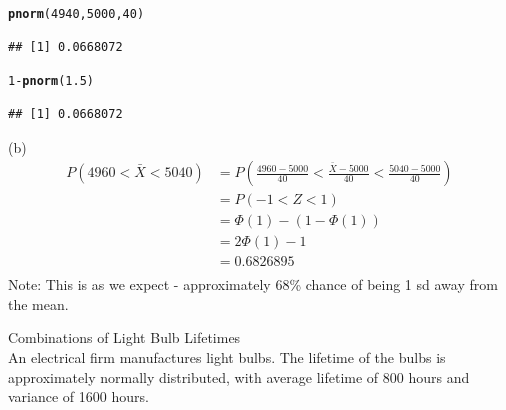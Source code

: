 \documentclass[bigtut]{tutorial}\usepackage[]{graphicx}\usepackage[]{color}
\makeatletter
\newcommand{\hlnum}[1]{\textcolor[rgb]{0.686,0.059,0.569}{#1}}%
\newcommand{\hlopt}[1]{\textcolor[rgb]{0,0,0}{#1}}%
\newcommand{\hlstd}[1]{\textcolor[rgb]{0.345,0.345,0.345}{#1}}%
\newcommand{\hlkwd}[1]{\textcolor[rgb]{0.737,0.353,0.396}{\textbf{#1}}}%
\newenvironment{kframe}{%
 \def\at@end@of@kframe{}%
 \ifinner\ifhmode%
  \def\at@end@of@kframe{\end{minipage}}%
  \begin{minipage}{\columnwidth}%
 \fi\fi%
 \def\FrameCommand##1{\hskip\@totalleftmargin \hskip-\fboxsep
 \colorbox{shadecolor}{##1}\hskip-\fboxsep
     \hskip-\linewidth \hskip-\@totalleftmargin \hskip\columnwidth}%
 \MakeFramed {\advance\hsize-\width
   \@totalleftmargin\z@ \linewidth\hsize
   \@setminipage}}%
 {\par\unskip\endMakeFramed%
 \at@end@of@kframe}
\newenvironment{knitrout}{}{} %
\makeatother
\begin{document}
\begin{tutorial}
\begin{questions}
\begin{solution}
\begin{knitrout}
\color{fgcolor}\begin{kframe}
\begin{alltt}
\hlkwd{pnorm}\hlstd{(}\hlnum{4940}\hlstd{,}\hlnum{5000}\hlstd{,}\hlnum{40}\hlstd{)}
\end{alltt}
\begin{verbatim}
## [1] 0.0668072
\end{verbatim}
\begin{alltt}
\hlnum{1}\hlopt{-}\hlkwd{pnorm}\hlstd{(}\hlnum{1.5}\hlstd{)}
\end{alltt}
\begin{verbatim}
## [1] 0.0668072
\end{verbatim}
\end{kframe}
\end{knitrout}

\vspace{.5cm}
(b)
 \begin{align*}
P( 4960 <      \bar{X}  < 5040) & = P( \frac{4960  - 5000}{40}  <     \frac { \bar{X} - 5000}{40}  < \frac{5040-5000}{40}) \\
& = P( -1 < Z < 1) \\
& = \Phi(1) - (1-\Phi(1)) \\
& = 2 \Phi(1) - 1 \\
& =  0.6826895 \\
\end{align*}
Note: This is as we expect - approximately 68\% chance of being 1 sd away from the mean.
\end{solution}


\question Combinations of Light Bulb Lifetimes \\

An electrical firm manufactures light bulbs. The lifetime of the bulbs is
approximately normally distributed, with average lifetime of 800 hours
and variance of 1600 hours. \\
                        

\end{questions}
\end{tutorial}
\end{document}
